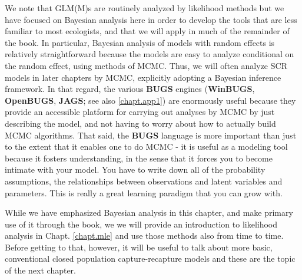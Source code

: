 We note that GLM(M)s are routinely
analyzed by likelihood methods but we have focused on Bayesian
analysis here in order to develop the tools that are less familiar to
most ecologists, and that we will apply in much of the remainder of the book.  In particular, Bayesian analysis of models with random
effects is relatively straightforward because the models
are easy to analyze conditional on the random effect, using methods of
MCMC.  Thus, we will often analyze SCR models in later chapters by
MCMC, explicitly adopting a Bayesian inference framework.
In that regard, the various {\bf BUGS} engines ({\bf WinBUGS}, {\bf
  OpenBUGS}, {\bf JAGS}; see also \ref{chapt.app1}) are enormously useful because they
provide an accessible platform for
carrying out  analyses by MCMC by just
describing the model, and not having to worry about how to actually
build MCMC algorithms.  That said, the {\bf BUGS} language is more important
than just to the extent that it enables one to do MCMC - it is useful
as a modeling tool because it fosters understanding, in the sense that
it forces you to become intimate with your model. You have to write
down all of the probability assumptions, the relationships between
observations and latent variables and parameters. This is really a
great learning paradigm that you can grow with.

While we have emphasized Bayesian analysis in this chapter, and make
primary use of it through the book, we
we will provide an introduction to likelihood analysis in Chapt.
\ref{chapt.mle} and use those  methods also from time to time.
 Before getting to that, however, it will be useful to
talk about more basic, conventional closed population
capture-recapture models and these are the topic of the next chapter.

